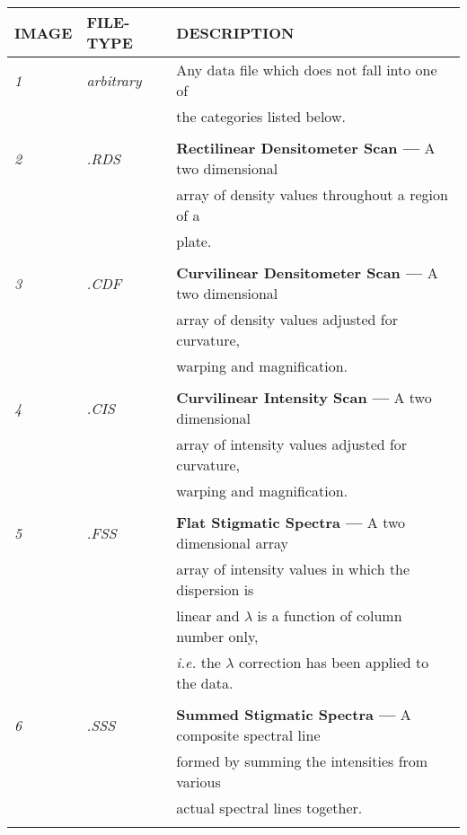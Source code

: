 \begin{center}
\begin{tabular}{||l l l||}
\hline
{\bf IMAGE} & {\bf FILE-TYPE} & {\bf DESCRIPTION}\\
\hline
{\em 1} & {\em arbitrary} & Any data file which does not fall into one of \\
        &                 & the categories listed below.\\
        &                 &                             \\

{\em 2} & {\em .RDS} & {\bf Rectilinear Densitometer Scan ---} A two dimensional
\\
        &            &      array of density values throughout a region of a \\
        &            &      plate.\\
        &            &            \\

{\em 3} & {\em .CDF} & {\bf Curvilinear Densitometer Scan ---} A two dimensional
\\
        &            &      array of density values adjusted for curvature,\\
        &            &      warping and magnification.\\
        &            &                                \\

{\em 4} & {\em .CIS} & {\bf Curvilinear Intensity Scan ---} A two dimensional \\
        &            &      array of intensity values adjusted for curvature,\\
        &            &      warping and magnification.\\
        &            &                                \\

{\em 5} & {\em .FSS} & {\bf Flat Stigmatic Spectra ---} A two dimensional array \\
        &            & array of intensity values in which the dispersion is \\
        &   & linear and $\lambda$ is a function of column number only,\\
  &  &    {\it i.e.} the $\lambda$ correction has been applied to the data. \\
  &    &  \\

{\em 6} & {\em .SSS} & {\bf Summed Stigmatic Spectra ---} A composite spectral
line \\
  &   &  formed by summing the intensities from various \\
  &   &    actual spectral lines together.\\
  &   &  \\


\end{tabular}
\end{center}
